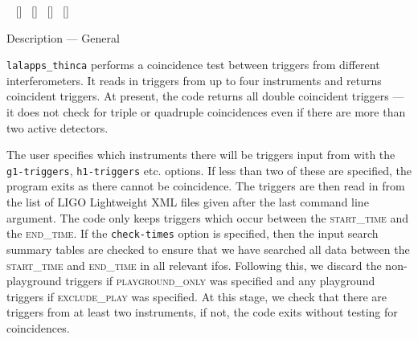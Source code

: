 \begin{entry}
[\option{--dm}]~ \newline \hspace*{0.5in}
[]~ \newline \hspace*{0.5in}
[]~ \newline \hspace*{0.5in}
[]~ \newline \hspace*{0.5in}
[]~ \newline \hspace*{0.5in}
~ \newline \hspace*{0.5in}
~ 
\newline \hspace*{0.5in}

\item[Description --- General] 

\verb$lalapps_thinca$ performs a coincidence test between triggers from
different interferometers.  It reads in triggers from up to four instruments
and returns coincident triggers.  At present, the code returns all double
coincident triggers --- it does not check for triple or quadruple coincidences
even if there are more than two active detectors.

The user specifies which instruments there will be triggers input from with
the \texttt{g1-triggers}, \texttt{h1-triggers} etc. options.  If less than two
of these are specified, the program exits as there cannot be coincidence.  The
triggers are then read in from the list of LIGO Lightweight XML files given
after the last command line argument.  The code only keeps triggers which
occur between the \textsc{start\_time} and the \textsc{end\_time}.  If the
\texttt{check-times} option is specified, then the input search summary tables
are checked to ensure that we have searched all data between the
\textsc{start\_time} and \textsc{end\_time} in all relevant ifos.  Following
this, we discard the non-playground triggers if \textsc{playground\_only} was
specified and any playground triggers if \textsc{exclude\_play} was specified.
At this stage, we check that there are triggers from at least two instruments,
if not, the code exits without testing for coincidences. 


\end{entry}
